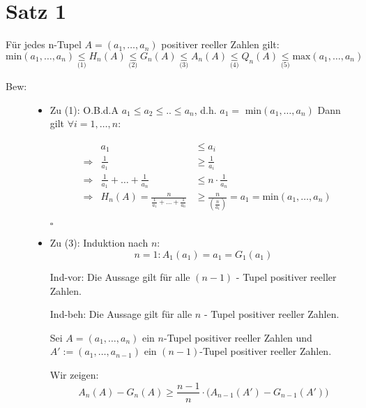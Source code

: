 \documentclass[12pt,a4paper,leqno]{article}
\begin{document}
\section*{Satz 1}

	Für jedes n-Tupel $A=(a_1,\dotsc, a_n)$ positiver reeller Zahlen gilt:
	$$\textrm{min}(a_1,\dotsc, a_n) \underset{\textrm{(1)}}{\leq} 
	 H_n(A) \underset{\textrm{(2)}}{\leq} 
	 G_n(A) \underset{\textrm{(3)}}{\leq} 
	 A_n(A) \underset{\textrm{(4)}}{\leq} 
	 Q_n(A) \underset{\textrm{(5)}}{\leq} 
	 \textrm{max}(a_1,\dotsc, a_n)$$
	
\begin{description}
\item[Bew:] \hfill

\begin{itemize}

	\item[] Zu (1): O.B.d.A $a_1 \leq a_2 \leq .. \leq a_n$, d.h. $a_1 =$ min$(a_1,\dotsc, a_n)$
	Dann gilt $\forall i = 1,\dotsc, n$:
	
	\begin{align*}
	& &a_1 &\leq a_i \\
	&\Rightarrow &\frac{1}{a_1} &\geq \frac{1}{a_i} \\
	&\Rightarrow &\frac{1}{a_1} + \ldots + \frac{1}{a_n} &\leq n  \cdot  \frac{1}{a_n} \\
	&\Rightarrow &H_n(A) = \frac{n}{\frac{1}{a_1} + \ldots + \frac{1}{a_n}} &\geq \frac{n}{\left(\frac{n}{a_1}\right)} = a_1 = \textrm{min}(a_1,\dotsc, a_n)
	\end{align*}
	 \begin{flushright}$\square$\end{flushright}

	\item[] Zu (3): Induktion nach $n$:
	$$n = 1: A_1(a_1) = a_1 = G_1(a_1)$$
	
	Ind-vor: Die Aussage gilt für alle $(n-1)$ - Tupel positiver reeller Zahlen.

	Ind-beh: Die Aussage gilt für alle $n$  - Tupel positiver reeller Zahlen.

	Sei $A=(a_1,\dotsc, a_n)$ ein $n$-Tupel positiver reeller Zahlen und\\
	$A' := (a_1,\dotsc, a_{n-1})$ ein $(n-1)$-Tupel positiver reeller Zahlen.


	Wir zeigen:
	\renewcommand{\theequation}{*} 
	\begin{equation}	
	A_n(A) - G_n(A) \geq \frac{n-1}{n}    \cdot  \bigg( A_{n-1}(A') - G_{n-1}(A')\bigg)
	\end{equation}
	

\end{itemize}
\end{description}
\end{document}
